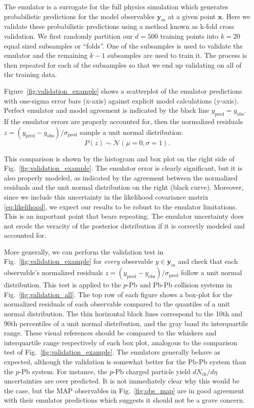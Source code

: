 \documentclass[aps,prc,reprint,amsmath,nofootinbib]{revtex4-1}
\newcommand{\nch}{N_\text{ch}}
\newcommand{\x}{\mathbf x}
\newcommand{\y}{\mathbf y}
\begin{document}
The emulator is a surrogate for the full physics simulation which generates probabilistic predictions for the model observables $\y_m$ at a given point $\x$.
Here we validate these probabilistic predictions using a method known as k-fold cross validation.
We first randomly partition our $d=500$ training points into $k=20$ equal sized subsamples or ``folds''.
One of the subsamples is used to validate the emulator and the remaining $k-1$ subsamples are used to train it.
The process is then repeated for each of the subsamples so that we end up validating on all of the training data.

Figure~\ref{fig:validation_example} shows a scatterplot of the emulator predictions with one-sigma error bars (x-axis) against explicit model calculations (y-axis).
Perfect emulator and model agreement is indicated by the black line $y_\text{pred} = y_\text{obs}$.
If the emulator errors are properly accounted for, then the normalized residuals ${z=(y_\text{pred} - y_\text{obs})/\sigma_\text{pred}}$ sample a unit normal distribution:
\begin{equation}
  P(z) \sim \mathcal{N}(\mu=0,\sigma=1).
\end{equation}

This comparison is shown by the histogram and box plot on the right side of Fig.~\ref{fig:validation_example}.
The emulator error is clearly significant, but it is also properly modeled, as indicated by the agreement between the normalized residuals and the unit normal distribution on the right (black curve).
Moreover, since we include this uncertainty in the likelihood covariance matrix \eqref{eq:likelihood}, we expect our results to be robust to the emulator limitations.
This is an important point that bears repeating.
The emulator uncertainty does not erode the veracity of the posterior distribution if it is correctly modeled and accounted for.

More generally, we can perform the validation test in Fig.~\ref{fig:validation_example} for \emph{every} observable $y \in \y_m$ and check that each observable's normalized residuals ${z=(y_\text{pred} - y_\text{obs})/\sigma_\text{pred}}$ follow a unit normal distribution.
This test is applied to the $p$-Pb and Pb-Pb collision systems in Fig.~\ref{fig:validation_all}.
The top row of each figure shows a box-plot for the normalized residuals of each observable compared to the quantiles of a unit normal distribution.
The thin horizontal black lines correspond to the 10th and 90th percentiles of a unit normal distribution, and the gray band its interquartile range.
These visual references should be compared to the whiskers and interquartile range respectively of each box plot, analogous to the comparison test of Fig.~\ref{fig:validation_example}.
The emulators generally behave as expected, although the validation is somewhat better for the Pb-Pb system than the $p$-Pb system.
For instance, the $p$-Pb charged particle yield $d\nch/d\eta$ uncertainties are over predicted.
It is not immediately clear why this would be the case, but the MAP observables in Fig.~\ref{fig:obs_map} are in good agreement with their emulator predictions which suggests it should not be a grave concern.
\end{document}
